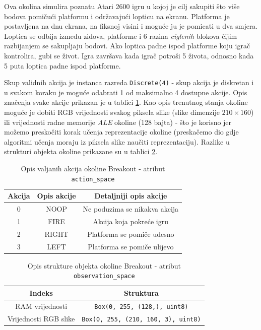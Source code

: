 Ova okolina simulira poznatu Atari 2600 igru u kojoj je cilj sakupiti što više bodova pomičući platformu i održavajući lopticu na ekranu. Platforma je postavljena na dnu ekrana, na fiksnoj visini i moguće ju je pomicati u dva smjera. Loptica se odbija između zidova, platforme i 6 razina \textit{ciglenih} blokova čijim razbijanjem se sakupljaju bodovi. Ako loptica padne ispod platforme koju igrač kontrolira, gubi se život. Igra završava kada igrač potroši 5 života, odnosno kada 5 puta loptica padne ispod platforme. 

Skup validnih akcija je instanca razreda \texttt{Discrete(4)} - skup akcija je diskretan i u svakom koraku je moguće odabrati 1 od maksimalno 4 dostupne akcije. Opis značenja svake akcije prikazan je u tablici \ref{table:breakout-action}. Kao opis trenutnog stanja okoline moguće je dobiti RGB vrijednosti svakog piksela slike (slike dimenzije $210 \times 160$) ili vrijednosti radne memorije \textit{ALE} okoline (128 bajta) - što je korisno jer možemo preskočiti korak učenja reprezentacije okoline (preskačemo dio gdje algoritmi učenja moraju iz piksela slike naučiti reprezentaciju). Razlike u strukturi objekta okoline prikazane su u tablici \ref{table:breakout-observation}. 

\begin{table}[ht]
    \centering
    \caption{Opis valjanih akcija okoline Breakout - atribut \texttt{action_space}}
    \begin{tabular}{c c c}
        \toprule
        Akcija & Opis akcije & Detaljniji opis akcije  \\
        \midrule
        0 & NOOP & Ne poduzima se nikakva akcija \\
        1 & FIRE & Akcija koja pokreće igru \\ 
        2 & RIGHT & Platforma se pomiče udesno \\ 
        3 & LEFT & Platforma se pomiče ulijevo  \\
        \bottomrule
    \end{tabular}
    \label{table:breakout-action}
\end{table}

\begin{table}[H]
    \centering
    \caption{Opis strukture objekta okoline Breakout - atribut \texttt{observation_space}}
    \begin{tabular}{c c}
        \toprule
        Indeks & Struktura  \\
        \midrule
        RAM vrijednosti & \texttt{Box(0, 255, (128,), uint8)}  \\ 
        Vrijednosti RGB slike & \texttt{Box(0, 255, (210, 160, 3), uint8)}  \\
        \bottomrule
    \end{tabular}
    \label{table:breakout-observation}
\end{table}

